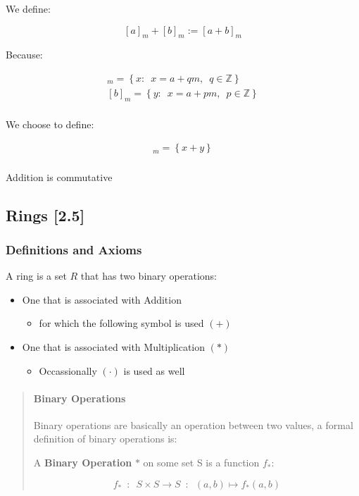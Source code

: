 \documentclass[
]{article}
\begin{document}
We define:

\[[a]_m + [b]_m := [a+b]_m\]

Because:

\begin{align} 
[a]_m = \left \{ x: \enspace x = a + qm, \enspace q \in \mathbb{Z} \right \} \\
[b]_m = \left \{ y: \enspace x = a + pm, \enspace p \in \mathbb{Z} \right \} \\
\end{align}

We choose to define:

\begin{align} 
[a+b]_m = \left \{ x+y \right \} \\
\end{align}

Addition is commutative

\hypertarget{header-n694}{%
\subsection{Rings {[}2.5{]}}\label{header-n694}}

\hypertarget{header-n696}{%
\subsubsection{Definitions and Axioms}\label{header-n696}}

A ring is a set \(R\) that has two binary operations:

\begin{itemize}
\item
  One that is associated with Addition

  \begin{itemize}
  \item
    for which the following symbol is used \((+)\)
  \end{itemize}
\item
  One that is associated with Multiplication \((*)\)

  \begin{itemize}
  \item
    Occassionally \((\cdot)\) is used as well
  \end{itemize}
\end{itemize}

\begin{quote}
\mbox{}%
\hypertarget{header-n711}{%
\paragraph{Binary Operations}\label{header-n711}}

Binary operations are basically an operation between two values, a
formal definition of binary operations is:

A \textbf{Binary Operation} \(*\) on some set S is a function \(f_*\):

\[f_*\enspace : \enspace  S\times S \rightarrow S \enspace  : \enspace (a,b) \mapsto f_*(a,b)\]
\end{quote}
\end{document}
